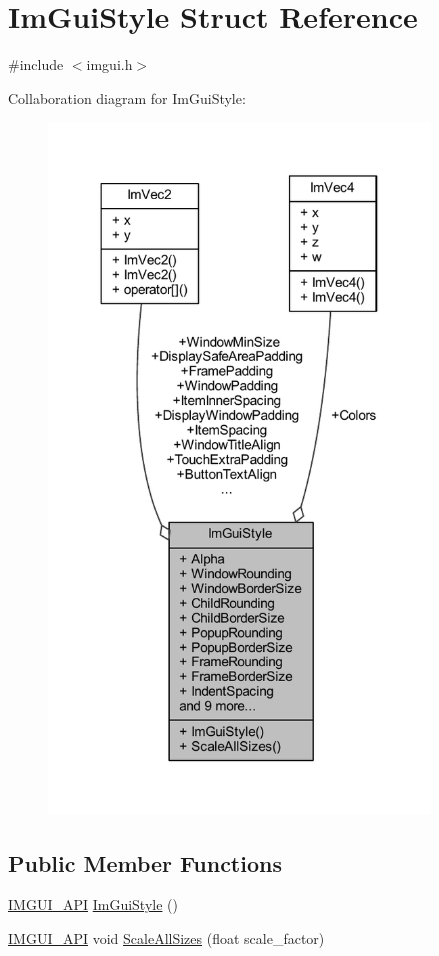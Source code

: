 \hypertarget{struct_im_gui_style}{}\section{Im\+Gui\+Style Struct Reference}
\label{struct_im_gui_style}


{\ttfamily \#include $<$imgui.\+h$>$}



Collaboration diagram for Im\+Gui\+Style\+:
\nopagebreak
\begin{figure}[H]
\begin{center}
\leavevmode
\includegraphics[width=287pt]{struct_im_gui_style__coll__graph}
\end{center}
\end{figure}
\subsection*{Public Member Functions}
\begin{DoxyCompactItemize}
\item 
\mbox{\hyperlink{imgui_8h_a43829975e84e45d1149597467a14bbf5}{I\+M\+G\+U\+I\+\_\+\+A\+PI}} \mbox{\hyperlink{struct_im_gui_style_ab0a3ffb3aeec3e6b09b9bde812b28369}{Im\+Gui\+Style}} ()
\item 
\mbox{\hyperlink{imgui_8h_a43829975e84e45d1149597467a14bbf5}{I\+M\+G\+U\+I\+\_\+\+A\+PI}} void \mbox{\hyperlink{struct_im_gui_style_a7c9d3e0974a239f65e433cc952be0627}{Scale\+All\+Sizes}} (float scale\+\_\+factor)
\end{DoxyCompactItemize}
